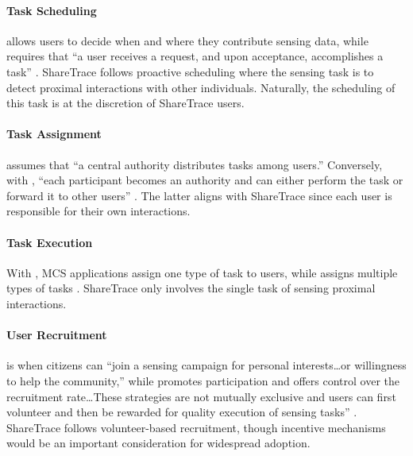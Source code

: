 \paragraph{Task Scheduling}

 allows users to decide when and where they contribute sensing data, while  requires that ``a user receives a request, and upon acceptance, accomplishes a task'' \citep{Capponi2019}. ShareTrace follows proactive scheduling where the sensing task is to detect proximal interactions with other individuals. Naturally, the scheduling of this task is at the discretion of ShareTrace users.

\paragraph{Task Assignment}

 assumes that ``a central authority distributes tasks among users.'' Conversely, with , ``each participant becomes an authority and can either perform the task or forward it to other users'' \citep{Capponi2019}. The latter aligns with ShareTrace since each user is responsible for their own interactions.

\paragraph{Task Execution}

With , MCS applications assign one type of task to users, while  assigns multiple types of tasks \citep{Capponi2019}. ShareTrace only involves the single task of sensing proximal interactions.

\paragraph{User Recruitment}

 is when citizens can ``join a sensing campaign for personal interests{\ldots}or willingness to help the community,'' while  promotes participation and offers control over the recruitment rate{\ldots}These strategies are not mutually exclusive and users can first volunteer and then be rewarded for quality execution of sensing tasks'' \citep{Capponi2019}. ShareTrace follows volunteer-based recruitment, though incentive mechanisms would be an important consideration for widespread adoption.

